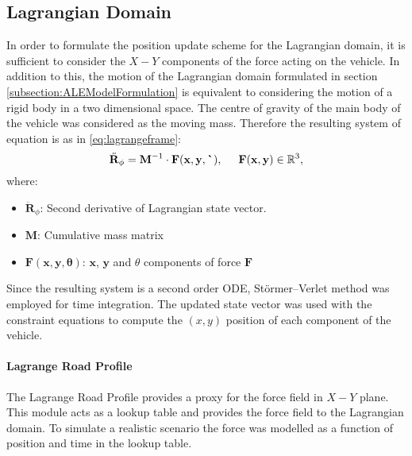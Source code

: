 \subsection{Lagrangian Domain} \label{subsection:lagrange}
In order to formulate the position update scheme for the Lagrangian domain, it is sufficient to consider the $X-Y$ components of the force acting on the vehicle. In addition to this, the motion of the Lagrangian domain formulated in section \ref{subsection:ALEModelFormulation} is equivalent to considering the motion of a rigid body in a two dimensional space. The centre of gravity of the main body of the vehicle was considered as the moving mass. Therefore the resulting system of equation is as in \eqref{eq:lagrangeframe}:
\begin{equation}
    \label{eq:lagrangeframe}
   \ddot{\mathbf{R}}_{\phi} = \mathbf{M}^{-1} \cdot \mathbf{F(x,y, \theta)}, \hspace{0.5 cm} \mathbf{F(x,y)} \in \mathbb{R}^{3},
\end{equation}
where: 
\begin{itemize}
    \item $\ddot{\mathbf{R}}_{\phi}$: Second derivative of Lagrangian state vector.
    \item $\mathbf{M}$: Cumulative mass matrix
    \item $\mathbf{F(x,y, \theta)}$: $\mathbf{x}$, $\mathbf{y}$ and $\theta$ components of force $\mathbf{F}$
\end{itemize}

\noindent Since the resulting system is a second order ODE, Störmer–Verlet method \cite{verlet1967} was employed for time integration. The updated state vector was used with the constraint equations to compute the $(x, y)$ position of each component of the vehicle.

\paragraph{Lagrange Road Profile}\label{par:lagrangeprofile}
The Lagrange Road Profile provides a proxy for the force field in $X-Y$ plane. This module acts as a lookup table and provides the force field to the Lagrangian domain. To simulate a realistic scenario the force was modelled as a function of position and time in the lookup table. 

